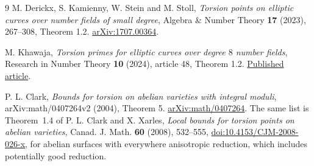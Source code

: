 \documentclass[11pt]{article}
\begin{document}
\begin{thebibliography}{9}
M. Derickx, S. Kamienny, W. Stein and M. Stoll,
\emph{Torsion points on elliptic curves over number fields of small
degree}, Algebra \& Number Theory \textbf{17} (2023), 267--308, Theorem 1.2.
\href{https://arxiv.org/pdf/1707.00364}{arXiv:1707.00364}.

M. Khawaja,
\emph{Torsion primes for elliptic curves over degree \(8\) number fields},
Research in Number Theory \textbf{10} (2024), article 48, Theorem 1.2.
\href{https://eprints.whiterose.ac.uk/id/eprint/211212/8/s40993-024-00533-6.pdf}{Published article}.

P. L. Clark,
\emph{Bounds for torsion on abelian varieties with integral moduli},
arXiv:math/0407264v2 (2004), Theorem 5.
\href{https://arxiv.org/pdf/math/0407264}{arXiv:math/0407264}.
The same list is Theorem~1.4 of P. L. Clark and X. Xarles, \emph{Local bounds for torsion points on abelian varieties}, Canad. J. Math. \textbf{60} (2008), 532--555, \href{https://doi.org/10.4153/CJM-2008-026-x}{doi:10.4153/CJM-2008-026-x}, for abelian surfaces with everywhere anisotropic reduction, which includes potentially good reduction.
\end{thebibliography}
\end{document}
